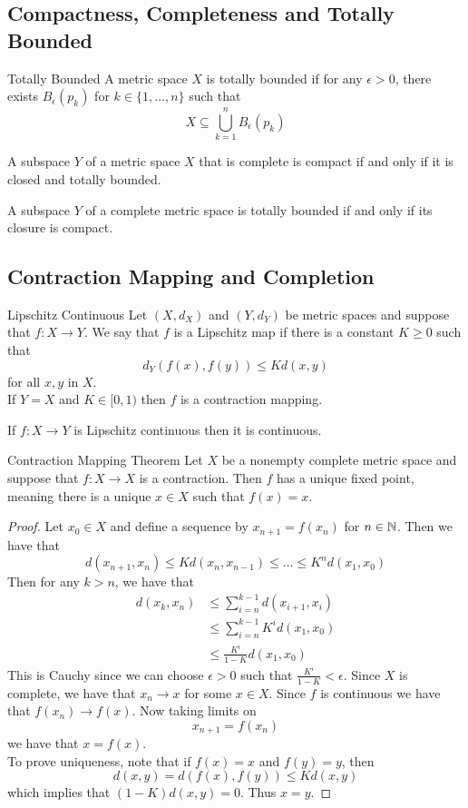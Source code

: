 \documentclass[a4paper]{article}
\begin{document}
\subsection{Compactness, Completeness and Totally Bounded}
\begin{defn}{Totally Bounded}{} A metric space $X$ is totally bounded if for any $\epsilon>0$, there exists $B_\epsilon(p_k)$ for $k\in\{1,\dots,n\}$ such that $$X\subseteq\bigcup_{k=1}^nB_\epsilon(p_k)$$
\end{defn}

\begin{thm}{}{} A subspace $Y$ of a metric space $X$ that is complete is compact if and only if it is closed and totally bounded. 
\end{thm}

\begin{thm}{}{} A subspace $Y$ of a complete metric space is totally bounded if and only if its closure is compact. 
\end{thm}

\subsection{Contraction Mapping and Completion}
\begin{defn}{Lipschitz Continuous}{} Let $(X,d_X)$ and $(Y,d_Y)$ be metric spaces and suppose that $f:X\to Y$. We say that $f$ is a Lipschitz map if there is a constant $K\geq 0$ such that $$d_Y(f(x),f(y))\leq Kd(x,y)$$ for all $x,y$ in $X$. \\
If $Y=X$ and $K\in[0,1)$ then $f$ is a contraction mapping. 
\end{defn}

\begin{lmm}{}{} If $f:X\to Y$ is Lipschitz continuous then it is continuous. 
\end{lmm}

\begin{thm}{Contraction Mapping Theorem}{} Let $X$ be a nonempty complete metric space and suppose that $f:X\to X$ is a contraction. Then $f$ has a unique fixed point, meaning there is a unique $x\in X$ such that $f(x)=x$. 
\begin{proof}
Let $x_0\in X$ and define a sequence by $x_{n+1}=f(x_n)$ for $n\in\mathbb{N}$. Then we have that $$d(x_{n+1},x_n)\leq Kd(x_n,x_{n-1})\leq\dots\leq K^nd(x_1,x_0)$$ Then for any $k>n$, we have that 
\begin{align*}
d(x_k,x_n)&\leq\sum_{i=n}^{k-1}d(x_{i+1},x_i)\\
&\leq\sum_{i=n}^{k-1}K^id(x_1,x_0)\\
&\leq\frac{K^i}{1-K}d(x_1,x_0)
\end{align*}
This is Cauchy since we can choose $\epsilon>0$ such that $\frac{K^i}{1-K}<\epsilon$. Since $X$ is complete, we have that $x_n\to x$ for some $x\in X$. Since $f$ is continuous we have that $f(x_n)\to f(x)$. Now taking limits on $$x_{n+1}=f(x_n)$$ we have that $x=f(x)$. \\
To prove uniqueness, note that if $f(x)=x$ and $f(y)=y$, then $$d(x,y)=d(f(x),f(y))\leq Kd(x,y)$$ which implies that $(1-K)d(x,y)=0$. Thus $x=y$. 
\end{proof}
\end{thm}
\end{document}
